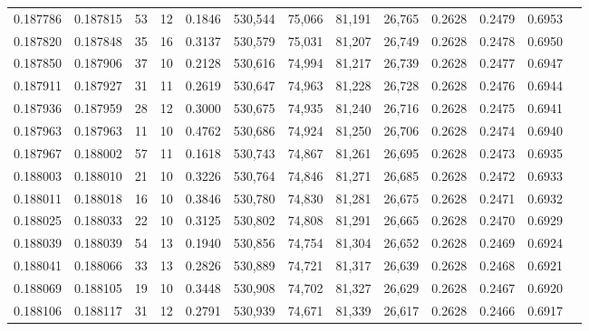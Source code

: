 \begin{tabular}{rrrrrrrrrrrrr}
0.187786 & 0.187815 &    53 &  12 &                                     0.1846 & 530,544 &  75,066 &  81,191 &  26,765 & 0.2628 & 0.2479 & 0.6953 \\
0.187820 & 0.187848 &    35 &  16 &                                     0.3137 & 530,579 &  75,031 &  81,207 &  26,749 & 0.2628 & 0.2478 & 0.6950 \\
0.187850 & 0.187906 &    37 &  10 &                                     0.2128 & 530,616 &  74,994 &  81,217 &  26,739 & 0.2628 & 0.2477 & 0.6947 \\
0.187911 & 0.187927 &    31 &  11 &                                     0.2619 & 530,647 &  74,963 &  81,228 &  26,728 & 0.2628 & 0.2476 & 0.6944 \\
0.187936 & 0.187959 &    28 &  12 &                                     0.3000 & 530,675 &  74,935 &  81,240 &  26,716 & 0.2628 & 0.2475 & 0.6941 \\
0.187963 & 0.187963 &    11 &  10 &                                     0.4762 & 530,686 &  74,924 &  81,250 &  26,706 & 0.2628 & 0.2474 & 0.6940 \\
0.187967 & 0.188002 &    57 &  11 &                                     0.1618 & 530,743 &  74,867 &  81,261 &  26,695 & 0.2628 & 0.2473 & 0.6935 \\
0.188003 & 0.188010 &    21 &  10 &                                     0.3226 & 530,764 &  74,846 &  81,271 &  26,685 & 0.2628 & 0.2472 & 0.6933 \\
0.188011 & 0.188018 &    16 &  10 &                                     0.3846 & 530,780 &  74,830 &  81,281 &  26,675 & 0.2628 & 0.2471 & 0.6932 \\
0.188025 & 0.188033 &    22 &  10 &                                     0.3125 & 530,802 &  74,808 &  81,291 &  26,665 & 0.2628 & 0.2470 & 0.6929 \\
0.188039 & 0.188039 &    54 &  13 &                                     0.1940 & 530,856 &  74,754 &  81,304 &  26,652 & 0.2628 & 0.2469 & 0.6924 \\
0.188041 & 0.188066 &    33 &  13 &                                     0.2826 & 530,889 &  74,721 &  81,317 &  26,639 & 0.2628 & 0.2468 & 0.6921 \\
0.188069 & 0.188105 &    19 &  10 &                                     0.3448 & 530,908 &  74,702 &  81,327 &  26,629 & 0.2628 & 0.2467 & 0.6920 \\
0.188106 & 0.188117 &    31 &  12 &                                     0.2791 & 530,939 &  74,671 &  81,339 &  26,617 & 0.2628 & 0.2466 & 0.6917 \\

\end{tabular}
